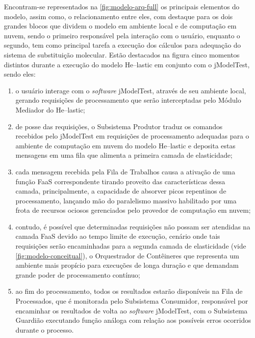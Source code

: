 \documentclass[english,brazilian]{UNISINOSmonografia} %
\begin{document}
Encontram-se representados na \autoref{fig:modelo-arq-full} os principais elementos do modelo, assim como, o relacionamento entre eles, com destaque para os dois grandes blocos que dividem o modelo em ambiente local e de computação em nuvem, sendo o primeiro responsável pela interação com o usuário, enquanto o segundo, tem como principal tarefa a execução dos cálculos para adequação do sistema de substituição molecular.
Estão destacados na figura cinco momentos distintos durante a execução do modelo \textsf{He}--lastic em conjunto com o jModelTest, sendo eles: 
\begin{enumerate}[label={\arabic*)}]

	\item o usuário interage com o \textit{software} jModelTest, através de seu ambiente local, gerando requisições de processamento que serão interceptadas pelo Módulo Mediador do \textsf{He}--lastic;

	\item de posse das requisições, o Subsistema Produtor traduz os comandos recebidos pelo jModelTest em requisições de processamento adequadas para o ambiente de computação em nuvem do modelo \textsf{He}--lastic e deposita estas mensagens em uma fila que alimenta a primeira camada de elasticidade;
	
	\item cada mensagem recebida pela Fila de Trabalhos causa a ativação de uma função FaaS correspondente tirando proveito das características dessa camada, principalmente, a capacidade de absorver picos repentinos de processamento, lançando mão do paralelismo massivo habilitado por uma frota de recursos ociosos gerenciados pelo provedor de computação em nuvem;
	
	\item contudo, é possível que determinadas requisições não possam ser atendidas na camada FaaS devido ao tempo limite de execução, cenário onde tais requisições serão encaminhadas para a segunda camada de elasticidade (vide \autoref{fig:modelo-conceitual}), o Orquestrador de Contêineres que representa um ambiente mais propício para execuções de longa duração e que demandam grande poder de processamento contínuo;
	
	\item ao fim do processamento, todos os resultados estarão disponíveis na Fila de Processados, que é monitorada pelo Subsistema Consumidor, responsável por encaminhar os resultados de volta ao \textit{software} jModelTest, com o Subsistema Guardião executando função análoga com relação aos possíveis erros ocorridos durante o processo.
\end{enumerate}
\end{document}
